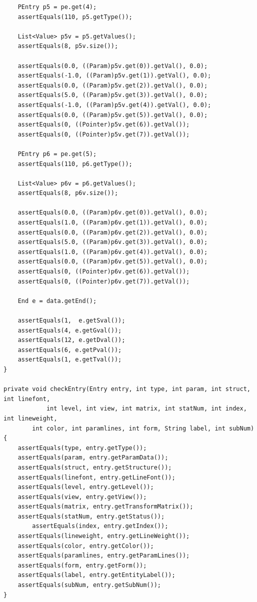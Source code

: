 \begin{Verbatim}
	PEntry p5 = pe.get(4);
	assertEquals(110, p5.getType());
	
	List<Value> p5v = p5.getValues();
	assertEquals(8, p5v.size());
	
	assertEquals(0.0, ((Param)p5v.get(0)).getVal(), 0.0);
	assertEquals(-1.0, ((Param)p5v.get(1)).getVal(), 0.0);
	assertEquals(0.0, ((Param)p5v.get(2)).getVal(), 0.0);
	assertEquals(5.0, ((Param)p5v.get(3)).getVal(), 0.0);
	assertEquals(-1.0, ((Param)p5v.get(4)).getVal(), 0.0);
	assertEquals(0.0, ((Param)p5v.get(5)).getVal(), 0.0);
	assertEquals(0, ((Pointer)p5v.get(6)).getVal());
	assertEquals(0, ((Pointer)p5v.get(7)).getVal());
	
	PEntry p6 = pe.get(5);
	assertEquals(110, p6.getType());
	
	List<Value> p6v = p6.getValues();
	assertEquals(8, p6v.size());
	
	assertEquals(0.0, ((Param)p6v.get(0)).getVal(), 0.0);
	assertEquals(1.0, ((Param)p6v.get(1)).getVal(), 0.0);
	assertEquals(0.0, ((Param)p6v.get(2)).getVal(), 0.0);
	assertEquals(5.0, ((Param)p6v.get(3)).getVal(), 0.0);
	assertEquals(1.0, ((Param)p6v.get(4)).getVal(), 0.0);
	assertEquals(0.0, ((Param)p6v.get(5)).getVal(), 0.0);
	assertEquals(0, ((Pointer)p6v.get(6)).getVal());
	assertEquals(0, ((Pointer)p6v.get(7)).getVal());

	End e = data.getEnd();
	
	assertEquals(1,  e.getSval());
	assertEquals(4, e.getGval());
	assertEquals(12, e.getDval());
	assertEquals(6, e.getPval());
	assertEquals(1, e.getTval());
}
	
private void checkEntry(Entry entry, int type, int param, int struct, int linefont, 
            int level, int view, int matrix, int statNum, int index, int lineweight, 
	    int color, int paramlines, int form, String label, int subNum) {
	assertEquals(type, entry.getType());
	assertEquals(param, entry.getParamData());
	assertEquals(struct, entry.getStructure());
	assertEquals(linefont, entry.getLineFont());
	assertEquals(level, entry.getLevel());
	assertEquals(view, entry.getView());
	assertEquals(matrix, entry.getTransformMatrix());
	assertEquals(statNum, entry.getStatus());
        assertEquals(index, entry.getIndex());
	assertEquals(lineweight, entry.getLineWeight());
	assertEquals(color, entry.getColor());
	assertEquals(paramlines, entry.getParamLines());
	assertEquals(form, entry.getForm());
	assertEquals(label, entry.getEntityLabel());
	assertEquals(subNum, entry.getSubNum());
}
\end{Verbatim}

